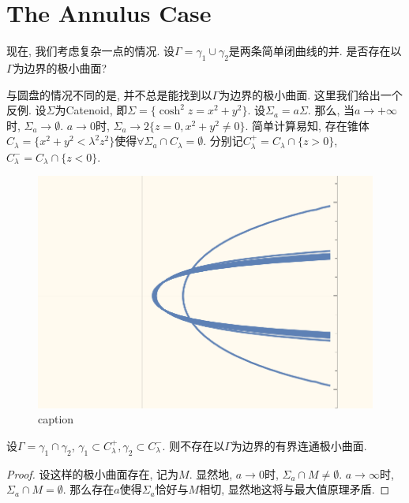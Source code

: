 \section{The Annulus Case}
现在, 我们考虑复杂一点的情况. 设$\Gamma=\gamma_1 \cup \gamma_2$是两条简单闭曲线的并. 是否存在以$\Gamma$为边界的极小曲面?  
\par 与圆盘的情况不同的是,  并不总是能找到以$\Gamma$为边界的极小曲面.  这里我们给出一个反例.  设$\Sigma$为Catenoid, 即$\Sigma=\{\cosh^2 z = x^2+y^2\}$.  设$\Sigma_a= a\Sigma$.  那么, 当$a \to +\infty$时,  $\Sigma_a \to \emptyset$.  $a\to 0$时, $\Sigma_a \to 2\{z=0, x^2+y^2\ne 0\}$.  简单计算易知,  存在锥体$C_\lambda=\{x^2+y^2< \lambda^2z^2\}$使得$\forall \Sigma_a \cap C_\lambda = \emptyset$.  分别记$C^+_\lambda=C_\lambda \cap \{z>0\}$, $C^-_\lambda=C_\lambda \cap \{z<0\}$. 
\begin{figure}[ht]
    \centering
    \includegraphics[scale=0.5]{images/sequence_of_catenoid.png}
    \caption{caption}
    \label{label}
\end{figure}
%
\begin{proposition}
    设$\Gamma=\gamma_1 \cap \gamma_2$, $\gamma_1 \subset C^+_\lambda, \gamma_2 \subset C^-_\lambda$. 则不存在以$\Gamma$为边界的有界连通极小曲面.
\end{proposition}
\begin{proof}
    设这样的极小曲面存在, 记为$M$.  显然地, $a \to 0$时,  $\Sigma_a \cap M \ne \emptyset$.  $a \to \infty$时, $\Sigma_a \cap M = \emptyset$. 那么存在$a$使得$\Sigma_a$恰好与$M$相切, 显然地这将与最大值原理矛盾.
\end{proof}

